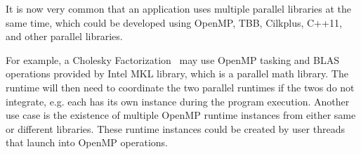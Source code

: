 It is now very common that an application uses multiple parallel libraries at the same time, which could be developed 
using OpenMP, TBB, Cilkplus, C++11, and other parallel libraries. 

For example, a Cholesky Factorization~\cite{intertwine} may use OpenMP 
tasking and BLAS operations provided by Intel MKL library,
which is a parallel math library. The runtime will then need to coordinate the two
parallel runtimes if the twos do not integrate, e.g. each has its own instance during the program execution. Another use case is the existence of multiple OpenMP runtime instances from either same or different libraries. These runtime instances could be created by user threads that launch into
OpenMP operations. 
